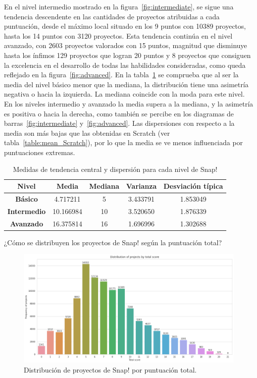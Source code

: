 \documentclass[a4paper, 12pt]{book}
\begin{document}
En el nivel intermedio mostrado en la figura~\ref{fig:intermediate}, se sigue una tendencia descendente en las cantidades de proyectos atribuidas a cada puntuación, desde el máximo local situado en los 9 puntos con 10389 proyectos, hasta los 14 puntos con 3120 proyectos. Esta tendencia continúa en el nivel avanzado, con 2603 proyectos valorados con 15 puntos, magnitud que disminuye hasta los ínfimos 129 proyectos que logran 20 puntos y 8 proyectos que consiguen la excelencia en el desarrollo de todas las habilidades consideradas, como queda reflejado en la figura~\ref{fig:advanced}.
En la tabla~\ref{table:mean_Snap} se comprueba que al ser la media del nivel básico menor que la mediana, la distribución tiene una asimetría negativa o hacia la izquierda. La mediana coincide con la moda para este nivel. En los niveles intermedio y avanzado la media supera a la mediana, y la asimetría es positiva o hacia la derecha, como también se percibe en los diagramas de barras~\ref{fig:intermediate} y~\ref{fig:advanced}.
Las dispersiones con respecto a la media son más bajas que las obtenidas en Scratch (ver tabla~\ref{table:mean_Scratch}), por lo que la media se ve menos influenciada por puntuaciones extremas. 

\begin{table}[H]
 \begin{center}
  \begin{tabular}{|c|c|c|c|c|}
    \hline
     \textbf{Nivel} & \textbf{Media} & \textbf{Mediana} & \textbf{Varianza} & \textbf{Desviación típica} \\ \hline
    \textbf{Básico} & 4.717211 & 5 & 3.433791 & 1.853049 \\ \hline
    \textbf{Intermedio} & 10.166984 & 10 & 3.520650 & 1.876339 \\ \hline
    \textbf{Avanzado} & 16.375814 & 16 & 1.696996 & 1.302688 \\ \hline
  \end{tabular}
  \caption{Medidas de tendencia central y dispersión para cada nivel de Snap!}
  \label{table:mean_Snap}
 \end{center}
\end{table}

¿Cómo se distribuyen los proyectos de Snap! según la puntuación total?

\begin{figure}[H]
    \centering
    \includegraphics[width=.9\textwidth]{img/frequency_total_score.png}
    \caption{Distribución de proyectos de Snap! por puntuación total.}\label{fig:total}
\end{figure}
\end{document}
